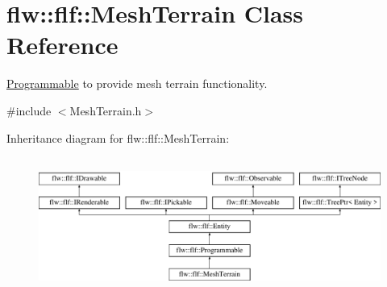 \hypertarget{classflw_1_1flf_1_1MeshTerrain}{}\section{flw\+:\+:flf\+:\+:Mesh\+Terrain Class Reference}
\label{classflw_1_1flf_1_1MeshTerrain}


\hyperlink{classflw_1_1flf_1_1Programmable}{Programmable} to provide mesh terrain functionality.  




{\ttfamily \#include $<$Mesh\+Terrain.\+h$>$}

Inheritance diagram for flw\+:\+:flf\+:\+:Mesh\+Terrain\+:\begin{figure}[H]
\begin{center}
\leavevmode
\includegraphics[height=4.487180cm]{classflw_1_1flf_1_1MeshTerrain}
\end{center}
\end{figure}
